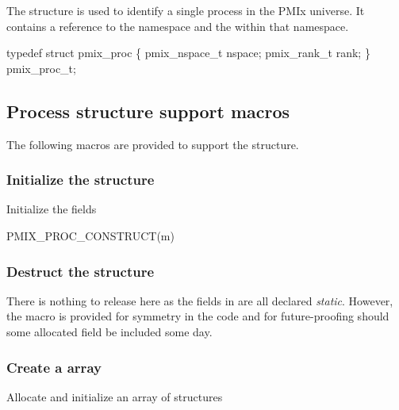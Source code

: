 The  structure is used to identify a single process in the PMIx universe.
It contains a reference to the namespace and the  within that namespace.

\cspecificstart
\begin{codepar}
typedef struct pmix_proc \{
    pmix_nspace_t nspace;
    pmix_rank_t rank;
\} pmix_proc_t;
\end{codepar}
\cspecificend

\subsection{Process structure support macros}
The following macros are provided to support the  structure.

\subsubsection{Initialize the  structure}

Initialize the  fields

\cspecificstart
\begin{codepar}
PMIX_PROC_CONSTRUCT(m)
\end{codepar}
\cspecificend

\begin{arglist}
\end{arglist}

\subsubsection{Destruct the  structure}

There is nothing to release here as the fields in  are all declared \emph{static}. However, the macro is provided for symmetry in the code and for future-proofing should some allocated field be included some day.

\subsubsection{Create a  array}

Allocate and initialize an array of  structures

